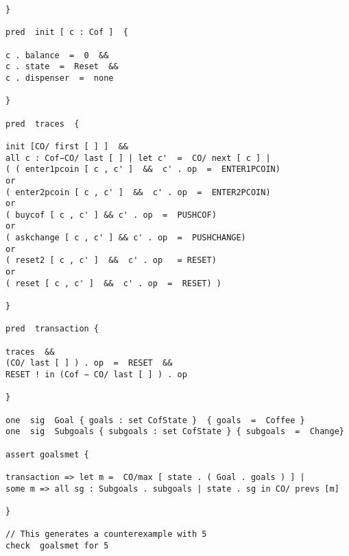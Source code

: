 \documentclass[a4paper,12pt]{extarticle}
\begin{document}
\begin{verbatim}
}

pred  init [ c : Cof ]  {

c . balance  =  0  &&
c . state  =  Reset  &&
c . dispenser  =  none

}

pred  traces  {

init [CO/ first [ ] ]  &&
all c : Cof−CO/ last [ ] | let c'  =  CO/ next [ c ] |
( ( enter1pcoin [ c , c' ]  &&  c' . op  =  ENTER1PCOIN)
or
( enter2pcoin [ c , c' ]  &&  c' . op  =  ENTER2PCOIN)
or
( buycof [ c , c' ] && c' . op  =  PUSHCOF)
or
( askchange [ c , c' ] && c' . op  =  PUSHCHANGE)
or
( reset2 [ c , c' ]  &&  c' . op   = RESET)
or
( reset [ c , c' ]  &&  c' . op  =  RESET) )

}

pred  transaction {

traces  &&
(CO/ last [ ] ) . op  =  RESET  &&
RESET ! in (Cof − CO/ last [ ] ) . op

}

one  sig  Goal { goals : set CofState }  { goals  =  Coffee }
one  sig  Subgoals { subgoals : set CofState } { subgoals  =  Change}

assert goalsmet {

transaction => let m =  CO/max [ state . ( Goal . goals ) ] |
some m => all sg : Subgoals . subgoals | state . sg in CO/ prevs [m]

}

// This generates a counterexample with 5
check  goalsmet for 5

\end{verbatim}
\newpage
\end{document}
